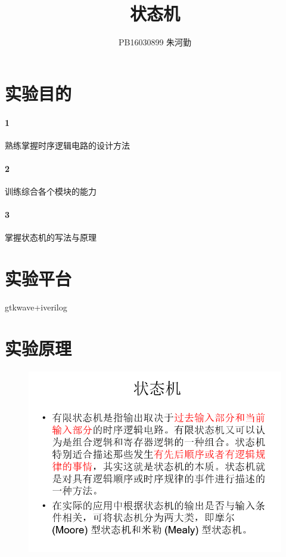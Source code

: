 \documentclass[UTF8]{ctexart}
\title{状态机}
\author{PB16030899 朱河勤}
\begin{document}
\maketitle
\tableofcontents

\section{实验目的}

\paragraph{1}熟练掌握时序逻辑电路的设计方法
\paragraph{2}训练综合各个模块的能力
\paragraph{3}掌握状态机的写法与原理


\section{实验平台}
gtkwave+iverilog


\section{实验原理}
\begin{figure}[H]
  \centering
  \includegraphics[width=1\textwidth]{fsm.png}
\end{figure}
\end{document}
